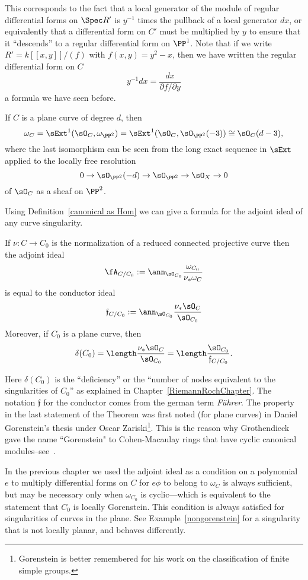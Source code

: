 \begin{example}
This corresponds to the fact that a local generator of the module of regular differential forms
on $\Spec R'$ is $y^{-1}$ times the pullback of a local generator $dx$, or equivalently
that a differential form on $C'$ must be multiplied by $y$ to ensure that it ``descends'' to a regular differential
form on $\PP^1$. Note that if we write
$R' = k[[x,y]]/(f)$  with $f(x,y) = y^2-x$, then we have written the regular differential form on $C$
$$
y^{-1}dx = \frac{dx}{\partial f/\partial y}
$$
a formula we have seen before.
\end{example}
 

\begin{example}
 If $C$ is a plane curve of degree $d$, then 
$$
\omega_C = \sExt^1(\sO_C, \omega_{\PP^2}) = \sExt^1(\sO_C, \sO_{\PP^2}(-3)) \cong \sO_C(d-3),
$$
where the last isomorphism can be seen from the long exact sequence in $\sExt$ applied
to the locally free resolution
$$
0\to \sO_{\PP^2}(-d) \to \sO_{\PP^2} \to\sO_{X} \to 0
$$
of $\sO_C$ as a sheaf on $\PP^2$. 
\end{example}

Using Definition~\ref{canonical as Hom} we can give a formula for the adjoint ideal of any curve singularity.

\begin{theorem}\label{general adjoint}
If $\nu: C \to C_0$ is the normalization of a reduced connected projective curve then the 
adjoint ideal 
$$
\fA_{C/C_0} :=\ann_{\sO_{C_0}}\frac{\omega_{C_0}}{\nu_* \omega_C}
$$
is equal to the conductor ideal
$$
\mathfrak f_{C/C_0}: = \ann_{\sO_{C_0}}\frac{\nu_* \sO_C}{\sO_{C_0}}	
$$
Moreover, if $C_0$ is a plane curve, then 
$$
\delta(C_0) = \length \frac{\nu_* \sO_C}{\sO_{C_0}} = \length \frac {\sO_{C_0}}{\mathfrak f_{C/C_0}}.
$$
\end{theorem}

Here $\delta(C_0)$ is the ``deficiency'' or the ``number of nodes equivalent to the singularities of $C_0$'' as
explained in Chapter~\ref{RiemannRochChapter}. The notation $\mathfrak f$ for the conductor comes from the german term \emph{F\"uhrer}. The property in the last statement of the
Theorem  was first noted (for plane curves) in Daniel Gorenstein's thesis under Oscar Zariski\footnote{Gorenstein is better remembered for his work on the classification of finite simple groups.}. This is the
reason why Grothendieck gave the name ``Gorenstein" to Cohen-Macaulay rings that have cyclic canonical 
modules--see~\cite{Bass}. 

In the previous chapter we used the adjoint ideal as a condition on a polynomial
$e$ to multiply differential forms on $C$ for $e\phi$ to belong to $\omega_C$ is always sufficient, but may be necessary only
when $\omega_{C_0}$ is cyclic---which is equivalent to the statement that $C_0$ is locally
Gorenstein. This condition is always satisfied for singularities of curves in the plane.
See Example~\ref{nongorenstein} for a singularity that is not locally planar, and behaves differently.


